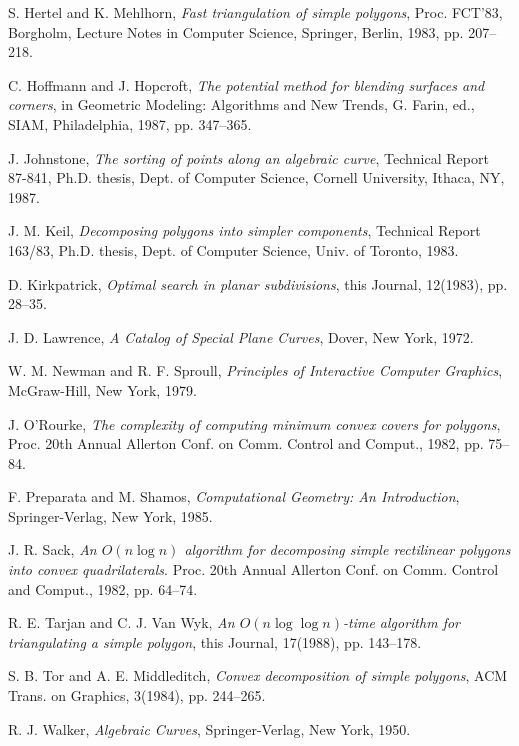 \begin{thebibliography}{Abhyankar 87b}

S. Hertel and K. Mehlhorn, 
{\em Fast triangulation of simple polygons},
Proc. FCT'83, Borgholm, Lecture Notes in Computer Science, 
Springer, Berlin, 1983, pp. 207--218.

C. Hoffmann and J. Hopcroft, 
{\em The potential method for blending surfaces and corners},
in Geometric Modeling: Algorithms and New Trends, G. Farin, ed.,
SIAM, Philadelphia, 1987, pp. 347--365.

J. Johnstone, 
{\em The sorting of points along an algebraic curve}, 
Technical Report 87-841, Ph.D. thesis, Dept. of Computer Science, 
Cornell University, Ithaca, NY, 1987.

J. M. Keil, 
{\em Decomposing polygons into simpler components}, 
Technical Report 163/83, Ph.D. thesis, Dept. of Computer Science, 
Univ. of Toronto, 1983.

D. Kirkpatrick, 
{\em Optimal search in planar subdivisions}, 
this Journal, 12(1983), pp. 28--35.

J. D. Lawrence, 
{\em A Catalog of Special Plane Curves}, 
Dover, New York, 1972.


W. M. Newman and R. F. Sproull, 
{\em Principles of Interactive Computer Graphics},
McGraw-Hill, New York, 1979.


J. O'Rourke, 
{\em The complexity of computing minimum convex covers for polygons},
Proc. 20th Annual Allerton Conf. on Comm. Control and Comput., 1982, pp. 75--84.

F. Preparata and M. Shamos, 
{\em Computational Geometry: An Introduction},
Springer-Verlag, New York, 1985.

J. R. Sack,
{\em An $O(n \log n)$ algorithm for decomposing simple rectilinear polygons
into convex quadrilaterals}.
Proc. 20th Annual Allerton Conf. on Comm. Control and Comput., 1982, pp. 64--74.

R. E. Tarjan and C. J. Van Wyk,
{\em An $O(n \log \log n)$-time algorithm for triangulating a simple polygon},
this Journal, 17(1988), pp. 143--178.

S. B. Tor and A. E. Middleditch,
{\em Convex decomposition of simple polygons},
ACM Trans. on Graphics, 3(1984), pp. 244--265.

R. J. Walker,
{\em Algebraic Curves},
Springer-Verlag, New York, 1950.

\end{thebibliography}
